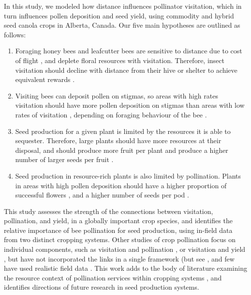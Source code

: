 \documentclass[12pt]{article} %
\begin{document}
In this study, we modeled how distance influences pollinator visitation, which in turn influences pollen deposition and seed yield, using commodity and hybrid seed canola crops in Alberta, Canada.
Our five main hypotheses are outlined as follows:
\begin{enumerate} 
    \item Foraging honey bees and leafcutter bees are sensitive to distance due to cost of flight \citep{schmid1985}, and deplete floral resources with visitation. Therefore, insect visitation should decline with distance from their hive or shelter to achieve equivalent rewards \citep{dukas1998, cresswell2000}. 
    \item Visiting bees can deposit pollen on stigmas, so areas with high rates visitation should have more pollen deposition on stigmas than areas with low rates of visitation \citep{mesquida1988c, hoyle2007}, depending on foraging behaviour of the bee \citep{free1983}.
    \item Seed production for a given plant is limited by the resources it is able to sequester. Therefore, large plants should have more resources at their disposal, and should produce more fruit per plant and produce a higher number of larger seeds per fruit \citep{galen1985, lawrence1993, marini2015}.
    \item Seed production in resource-rich plants is also limited by pollination. Plants in areas with high pollen deposition should have a higher proportion of successful flowers \citep{sabbahi2005}, and a higher number of seeds per pod \citep{morandin2005}.
\end{enumerate}

This study assesses the strength of the connections between visitation, pollination, and yield, in a globally important crop species, and identifies the relative importance of bee pollination for seed production, using in-field data from two distinct cropping systems.
Other studies of crop pollination focus on individual components, such as visitation and pollination \citep{cresswell1999, thomson2001}, or visitation and yield \citep{steffan2003, manning2005, hudewenz2013}, but have not incorporated the links in a single framework (but see \citealp{saez2018}, and few have used realistic field data \citep{morandin2005, isaacs2010}.
This work adds to the body of literature examining the resource context of pollination services \citep{haig1988} within cropping systems \citep{marini2015, tamburini2016, fijen2018, tamburini2019}, and identifies directions of future research in seed production systems.
\end{document}
